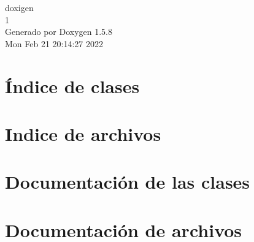 \documentclass[a4paper]{book}
\begin{document}
\begin{titlepage}
\vspace*{7cm}
\begin{center}
{\Large doxigen \\[1ex]\large 1 }\\
\vspace*{1cm}
{\large Generado por Doxygen 1.5.8}\\
\vspace*{0.5cm}
{\small Mon Feb 21 20:14:27 2022}\\
\end{center}
\end{titlepage}
\clearemptydoublepage
{}
\tableofcontents
\clearemptydoublepage
{}
\chapter{Índice de clases}

\chapter{Indice de archivos}

\chapter{Documentación de las clases}




\chapter{Documentación de archivos}




\printindex
\end{document}
